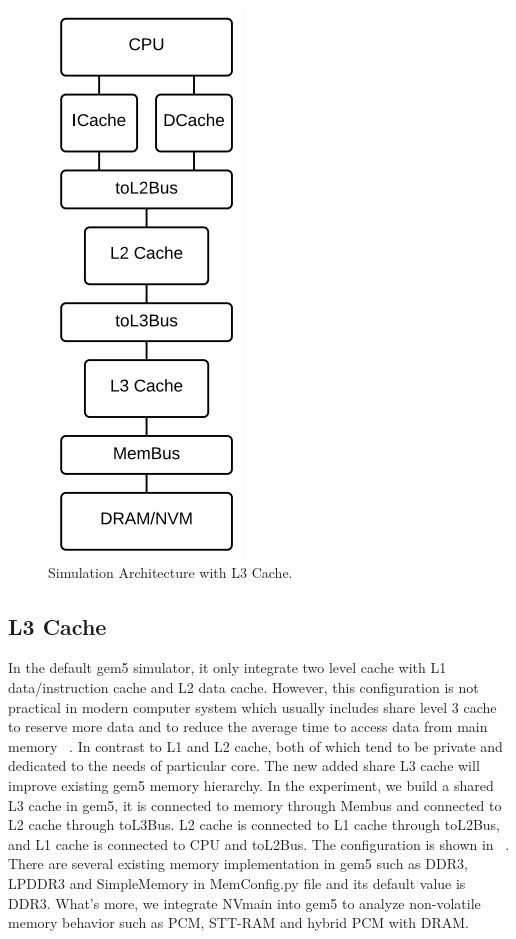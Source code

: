 \begin{figure}[t]
\centering
\includegraphics[scale=0.7]{figs/llc}
\caption{Simulation Architecture with L3 Cache.}
\label{fig:llc}
\end{figure}




\subsection{L3 Cache}
In the default gem5 simulator, it only integrate two level cache with L1 data/instruction cache and L2 data cache. However, this configuration is not practical in modern computer system which usually includes share level 3 cache to reserve more data and to reduce the average time to access data from main memory ~\cite{6835921}. In contrast to L1 and L2 cache, both of which tend to be private and dedicated to the needs of particular core. The new added share L3 cache will improve existing gem5 memory hierarchy. In the experiment, we build a shared L3 cache in gem5, it is connected to memory through Membus and connected to L2 cache through toL3Bus. L2 cache is connected to L1 cache through  toL2Bus, and L1 cache is connected to CPU and toL2Bus. The configuration is shown in ~. There are several existing memory implementation in gem5 such as DDR3, LPDDR3 and  SimpleMemory in MemConfig.py file and its default value is DDR3. What's more, we integrate NVmain into gem5 to analyze non-volatile memory behavior such as PCM, STT-RAM and hybrid PCM with DRAM.  



